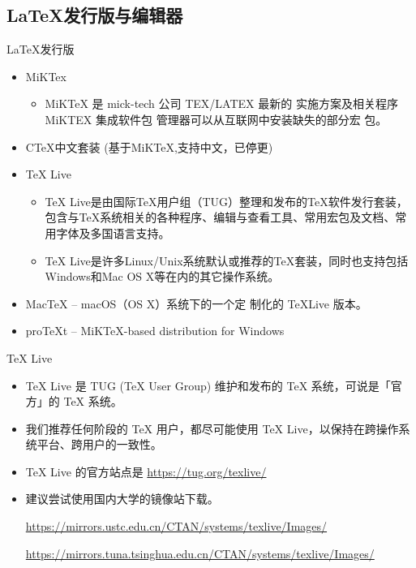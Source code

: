 \documentclass[13pt]{ctexbeamer}
\begin{document}
\subsection{LaTeX发行版与编辑器}
\begin{frame}{LaTeX发行版}
\begin{itemize}
	\item MiKTex 
		\begin{itemize}
	\item
	MiKTeX 是 mick-tech 公司 TEX/LATEX 最新的
实施方案及相关程序 MiKTEX 集成软件包
管理器可以从互联网中安装缺失的部分宏
包。
\end{itemize}
	\item CTeX中文套装 (基于MiKTeX,支持中文，已停更)
	
	\item \alert{TeX Live} 
	\begin{itemize}
	\item
	TeX Live是由国际TeX用户组（TUG）整理和发布的TeX软件发行套装，包含与TeX系统相关的各种程序、编辑与查看工具、常用宏包及文档、常用字体及多国语言支持。
		\item
	TeX Live是许多Linux/Unix系统默认或推荐的TeX套装，同时也支持包括Windows和Mac OS X等在内的其它操作系统。
	\end{itemize}

	\item MacTeX -- macOS（OS X）系统下的一个定
制化的 TeXLive 版本。

\item proTeXt -- MiKTeX-based distribution for Windows 
\end{itemize}
\end{frame}


\begin{frame}{TeX Live}

\begin{itemize}
	\item TeX Live 是 TUG (TeX User Group) 维护和发布的 TeX 系统，可说是「官方」的 TeX 系统。
	\item 我们推荐任何阶段的 TeX 用户，都尽可能使用 TeX Live，以保持在跨操作系统平台、跨用户的一致性。
	\item TeX Live 的官方站点是 \href{https://tug.org/texlive/}{https://tug.org/texlive/}
	\item 建议尝试使用国内大学的镜像站下载。
	
	\href{https://mirrors.ustc.edu.cn/CTAN/systems/texlive/Images/} {https://mirrors.ustc.edu.cn/CTAN/systems/texlive/Images/}
	
	
	\href{https://mirrors.tuna.tsinghua.edu.cn/CTAN/systems/texlive/Images/}{https://mirrors.tuna.tsinghua.edu.cn/CTAN/systems/texlive/Images/}
	
\end{itemize}
\end{frame} 
\end{document}
